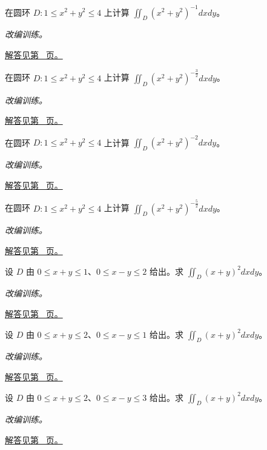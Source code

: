 \documentclass[UTF8,12pt,a4paper,fontset=fandol]{ctexart}
\begin{document}
\begin{example}[圆环上的径向负幂]\label{ex:c37q15}
在圆环 $D:1\le x^2+y^2\le4$ 上计算 $\iint_D(x^2+y^2)^{-1}dxdy$。
\par\textit{改编训练。}\par\hyperref[ans:c37q15]{解答见第~\pageref{ans:c37q15} 页。}
\end{example}
\begin{example}[圆环上的径向负幂]\label{ex:c37q16}
在圆环 $D:1\le x^2+y^2\le4$ 上计算 $\iint_D(x^2+y^2)^{-\frac{3}{2}}dxdy$。
\par\textit{改编训练。}\par\hyperref[ans:c37q16]{解答见第~\pageref{ans:c37q16} 页。}
\end{example}
\begin{example}[圆环上的径向负幂]\label{ex:c37q17}
在圆环 $D:1\le x^2+y^2\le4$ 上计算 $\iint_D(x^2+y^2)^{-2}dxdy$。
\par\textit{改编训练。}\par\hyperref[ans:c37q17]{解答见第~\pageref{ans:c37q17} 页。}
\end{example}
\begin{example}[圆环上的径向负幂]\label{ex:c37q18}
在圆环 $D:1\le x^2+y^2\le4$ 上计算 $\iint_D(x^2+y^2)^{-\frac{5}{2}}dxdy$。
\par\textit{改编训练。}\par\hyperref[ans:c37q18]{解答见第~\pageref{ans:c37q18} 页。}
\end{example}
\begin{example}[沿斜边界的线性换元]\label{ex:c37q19}
设 $D$ 由 $0\le x+y\le 1$、$0\le x-y\le 2$ 给出。求 $\displaystyle\iint_D(x+y)^2dxdy$。
\par\textit{改编训练。}\par\hyperref[ans:c37q19]{解答见第~\pageref{ans:c37q19} 页。}
\end{example}
\begin{example}[沿斜边界的线性换元]\label{ex:c37q20}
设 $D$ 由 $0\le x+y\le 2$、$0\le x-y\le 1$ 给出。求 $\displaystyle\iint_D(x+y)^2dxdy$。
\par\textit{改编训练。}\par\hyperref[ans:c37q20]{解答见第~\pageref{ans:c37q20} 页。}
\end{example}
\begin{example}[沿斜边界的线性换元]\label{ex:c37q21}
设 $D$ 由 $0\le x+y\le 2$、$0\le x-y\le 3$ 给出。求 $\displaystyle\iint_D(x+y)^2dxdy$。
\par\textit{改编训练。}\par\hyperref[ans:c37q21]{解答见第~\pageref{ans:c37q21} 页。}
\end{example}
\end{document}
